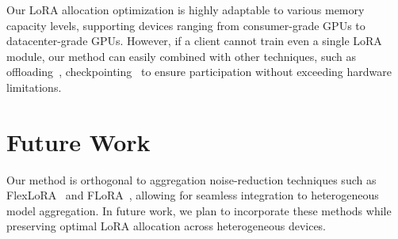 \documentclass[sigconf]{acmart}
\begin{document}
Our LoRA allocation optimization is highly adaptable to various memory capacity levels, supporting devices ranging from consumer-grade GPUs to datacenter-grade GPUs. However, if a client cannot train even a single LoRA module, our method can easily combined with other techniques, such as offloading~\cite{kar2023offloading}, checkpointing~\cite{rasley2020deepspeed} to ensure participation without exceeding hardware limitations.

\section{Future Work}\label{sec:appendix-futurework}

{Our method is orthogonal to aggregation noise-reduction techniques} such as FlexLoRA~\cite{bai2024federated} and FLoRA~\cite{wangflora}, allowing for seamless integration to heterogeneous model aggregation. In future work, we plan to incorporate these methods while preserving optimal LoRA allocation across heterogeneous devices.
\end{document}
